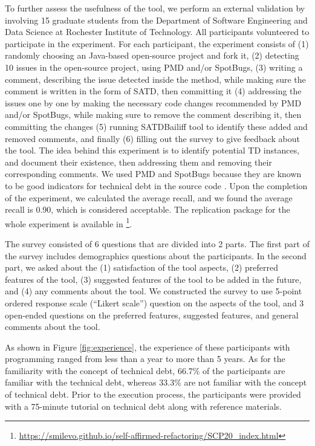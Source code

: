 \documentclass[3p]{elsarticle}
\begin{document}
To further assess the usefulness of the tool, we perform an external validation by involving 15 graduate students from the Department of Software Engineering and Data Science at Rochester Institute of Technology. All participants volunteered to participate in the experiment. For each participant, the experiment consists of (1) randomly choosing an Java-based open-source project and fork it, (2) detecting 10 issues in the open-source project, using PMD and/or SpotBugs, (3) writing a comment, describing the issue detected inside the method, while making sure the comment is written in the form of SATD, then committing it (4) addressing the issues one by one by making the necessary code changes recommended by PMD and/or SpotBugs, while making sure to remove the comment describing it, then committing the changes (5) running SATDBailiff tool to identify these added and removed comments, and finally (6) filling out the survey to give feedback about the tool. The idea behind this experiment is to identify potential TD instances, and document their existence, then addressing them and removing their corresponding comments. We used PMD and SpotBugs because they are known to be good indicators for technical debt in the source code \cite{zampetti2017recommending,amanatidis2020evaluating}. Upon the completion of the experiment, we calculated the average recall, and we found the average recall is 0.90, which is considered acceptable. The replication package for the whole experiment is available in \footnote{\url{https://smilevo.github.io/self-affirmed-refactoring/SCP20_index.html}}.
 
The survey consisted of 6 questions that are divided into 2 parts. The first part of the survey includes demographics questions about the participants. In the second part, we asked about the (1)  satisfaction of the tool aspects, (2) preferred features of the tool, (3) suggested features of the tool to be added in the future, and (4) any comments about the tool. We constructed the survey to use 5-point ordered response scale (“Likert scale”) question on the aspects of the tool, and 3 open-ended questions on the preferred features, suggested features, and general comments about the tool.
 
  As shown in Figure \ref{fig:experience}, the experience of these participants with programming ranged from less than a year to more than 5 years. As for the familiarity with the concept of technical debt, 66.7\% of the participants are familiar with the technical debt, whereas 33.3\% are not familiar with the concept of technical debt. Prior to the execution process, the participants were provided with a 75-minute tutorial on technical debt along with reference materials.
  
\end{document}
